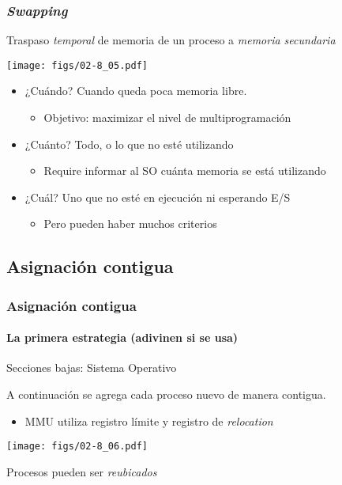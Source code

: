 \documentclass[letter]{beamer}
\begin{document}
\begin{frame}
  \frametitle{{\em Swapping}}

  Traspaso {\em temporal} de memoria de un proceso a {\em memoria secundaria}
  
  \begin{center}
    \texttt{[image: figs/02-8\_05.pdf]}
  \end{center}

  \begin{itemize}
    \item ¿Cuándo? Cuando queda poca memoria libre.
      \begin{itemize}
        \item Objetivo: maximizar el nivel de multiprogramación
      \end{itemize}
    \item ¿Cuánto? Todo, o lo que no esté utilizando
      \begin{itemize}
        \item Require informar al SO cuánta memoria se está utilizando
      \end{itemize}
    \item ¿Cuál? Uno que no esté en ejecución ni esperando E/S
      \begin{itemize}
        \item Pero pueden haber muchos criterios
      \end{itemize}
  \end{itemize}

\end{frame}

\subsection{Asignación contigua}

\begin{frame}
  \frametitle{Asignación contigua}
  \framesubtitle{La primera estrategia (adivinen si se usa)}

  Secciones bajas: Sistema Operativo
  
  A continuación se agrega cada proceso nuevo de manera contigua.
  
  \begin{itemize}
    \item MMU utiliza registro límite y registro de {\em relocation}
  \end{itemize}

  \begin{center}
    \texttt{[image: figs/02-8\_06.pdf]}
  \end{center}

  Procesos pueden ser {\em reubicados}
\end{frame}
\end{document}
